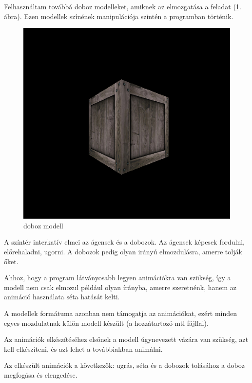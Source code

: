 Felhasználtam továbbá doboz modelleket, amiknek az elmozgatása a feladat (\ref{fig:box}. ábra). Ezen modellek színének manipulációja szintén a programban történik.

\begin{figure}[htp]
    \centering
   	\includegraphics[scale=0.5]{images/box.png}
	\caption{doboz modell}
	\label{fig:box}
\end{figure}


A színtér interkatív elmei az ágensek és a dobozok. 
Az ágensek képesek fordulni, előrehaladni, ugorni. 
A dobozok pedig olyan irányú elmozdulásra, amerre tolják őket.


Ahhoz, hogy a program látványosabb legyen animációkra van szükség, így a modell nem csak elmozul például olyan írányba, amerre szeretnénk, hanem az animáció használata séta hatását kelti.

A modellek formátuma azonban nem támogatja az animációkat, ezért minden egyes mozdulatnak külön modell készült (a hozzátartozó mtl fájllal).

Az animációk elkészítéséhez elsőnek a modell úgynevezett vázára van szükség, azt kell elkészíteni, és azt lehet a továbbiakban animálni. 
 
Az elkészült animációk a következők: ugrás, séta és a dobozok tolásához a doboz megfogása és elengedése.
 
